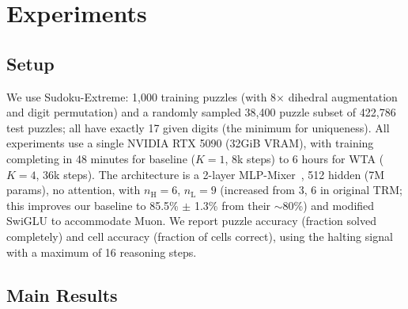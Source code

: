 \section{Experiments}

\subsection{Setup}

We use Sudoku-Extreme: 1,000 training puzzles (with 8$\times$ dihedral
augmentation and digit permutation) and a randomly sampled 38,400 puzzle subset
of 422,786 test puzzles; all have exactly 17 given digits (the minimum for
uniqueness). All experiments use a single NVIDIA RTX 5090 (32GiB VRAM), with
training completing in 48 minutes for baseline ($K{=}1$, 8k steps) to 6 hours
for WTA ($K{=}4$, 36k steps). The architecture is a 2-layer
MLP-Mixer~\citep{tolstikhin2021mlpmixer}, 512 hidden (7M params), no attention,
with $n_\text{H}{=}6$, $n_\text{L}{=}9$ (increased from 3, 6 in original TRM;
this improves our baseline to 85.5\% $\pm$ 1.3\% from their ${\sim}$80\%) and
modified SwiGLU to accommodate Muon. We report puzzle accuracy (fraction solved
completely) and cell accuracy (fraction of cells correct), using the halting
signal with a maximum of 16 reasoning steps.

\subsection{Main Results}

